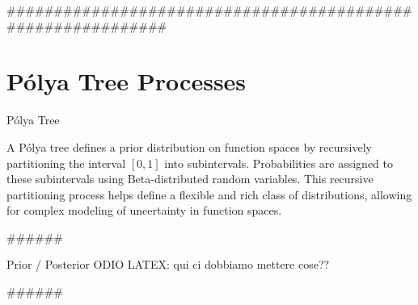 \documentclass{beamer}
\begin{document}
############################################################

\section{Pólya Tree Processes}
\begin{frame}{Pólya Tree}


A Pólya tree defines a prior distribution on function spaces by recursively partitioning the interval $[0, 1]$ into subintervals. Probabilities are assigned to these subintervals using Beta-distributed random variables. This recursive partitioning process helps define a flexible and rich class of distributions, allowing for complex modeling of uncertainty in function spaces.
\bigskip %

\begin{center}
    
\end{center}

\end{frame}

######
\begin{frame}{Prior / Posterior}
    ODIO LATEX: qui ci dobbiamo mettere cose??
\end{frame}

######
\end{document}
